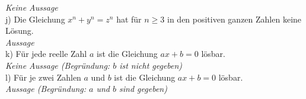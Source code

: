 \textit{Keine Aussage}\\

j) Die Gleichung $x^n + y^n = z^n$ hat für $n \geq 3$ in den positiven ganzen Zahlen keine Lösung.\\

\textit{Aussage}\\

k) Für jede reelle Zahl $a$ ist die Gleichung $ax + b = 0$ lösbar.\\

\textit{Keine Aussage (Begründung: $b$ ist nicht gegeben)}\\

l) Für je zwei Zahlen $a$ und $b$ ist die Gleichung $ax + b = 0$ lösbar.\\

\textit{Aussage (Begründung: $a$ und $b$ sind gegeben)}\\
